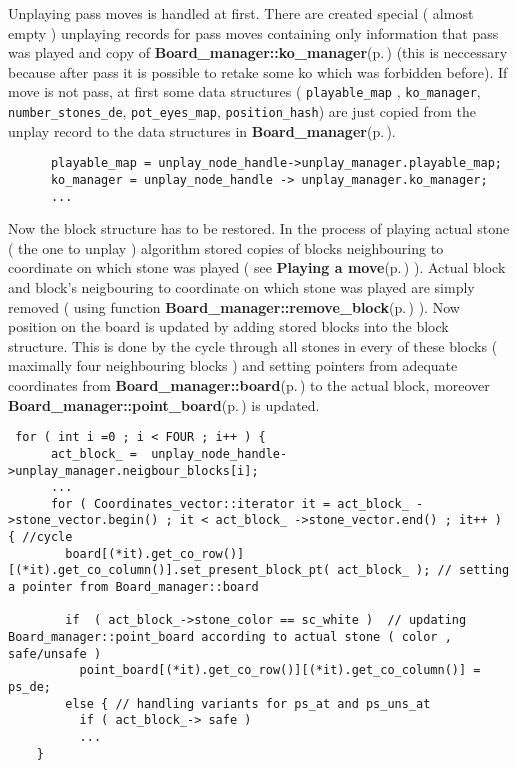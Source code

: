 Unplaying pass moves is handled at first. There are created special ( almost empty ) unplaying records for pass moves containing only information that pass was played and copy of {\bf Board\_\-manager::ko\_\-manager}{\rm (p.\,\pageref{classBoard__manager_o3})} (this is neccessary because after pass it is possible to retake some ko which was forbidden before). If move is not pass, at first some data structures ( {\tt playable\_\-map} , {\tt ko\_\-manager}, {\tt number\_\-stones\_\-de}, {\tt pot\_\-eyes\_\-map}, {\tt position\_\-hash}) are just copied from the unplay record to the data structures in {\bf Board\_\-manager}{\rm (p.\,\pageref{classBoard__manager})}.



\footnotesize\begin{verbatim}      playable_map = unplay_node_handle->unplay_manager.playable_map; 
      ko_manager = unplay_node_handle -> unplay_manager.ko_manager;
      ...
\end{verbatim}
\normalsize


Now the block structure has to be restored. In the process of playing actual stone ( the one to unplay ) algorithm stored copies of blocks neighbouring to coordinate on which stone was played ( see {\bf Playing a move}{\rm (p.\,\pageref{page_6_page_6__sec_3})} ). Actual block and block's neigbouring to coordinate on which stone was played are simply removed ( using function {\bf Board\_\-manager::remove\_\-block}{\rm (p.\,\pageref{classBoard__manager_a3})} ). Now position on the board is updated by adding stored blocks into the block structure. This is done by the cycle through all stones in every of these blocks ( maximally four neighbouring blocks ) and setting pointers from adequate coordinates from {\bf Board\_\-manager::board}{\rm (p.\,\pageref{classBoard__manager_r1})} to the actual block, moreover {\bf Board\_\-manager::point\_\-board}{\rm (p.\,\pageref{classBoard__manager_o5})} is updated.



\footnotesize\begin{verbatim} for ( int i =0 ; i < FOUR ; i++ ) {
      act_block_ =  unplay_node_handle->unplay_manager.neigbour_blocks[i];
      ... 
      for ( Coordinates_vector::iterator it = act_block_ ->stone_vector.begin() ; it < act_block_ ->stone_vector.end() ; it++ ) { //cycle 
        board[(*it).get_co_row()][(*it).get_co_column()].set_present_block_pt( act_block_ ); // setting a pointer from Board_manager::board

        if  ( act_block_->stone_color == sc_white )  // updating Board_manager::point_board according to actual stone ( color , safe/unsafe )
          point_board[(*it).get_co_row()][(*it).get_co_column()] = ps_de; 
        else { // handling variants for ps_at and ps_uns_at 
          if ( act_block_-> safe ) 
          ...
    }
\end{verbatim}
\normalsize


